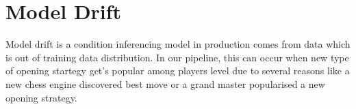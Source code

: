 

\section{Model Drift}
Model drift is a condition inferencing model in production comes from data which is out of training data distribution. In our pipeline, this can occur when new type of opening startegy get's popular among players level due to several reasons like a new chess engine discovered best move or a grand master popularised a new opening strategy. 


